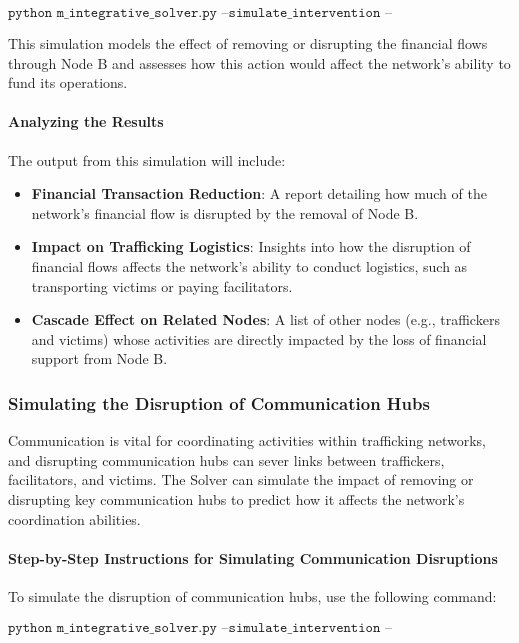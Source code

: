 \documentclass[%
 preprint, linenumbers,
 amsmath,amssymb,
 aps, physrev,
]{revtex4-2}
\begin{document}
\[
\texttt{python m\_integrative\_solver.py --simulate\_intervention --disrupt\_financial --node\_id 205}
\]

This simulation models the effect of removing or disrupting the financial flows through Node B and assesses how this action would affect the network’s ability to fund its operations.

\paragraph{Analyzing the Results}

The output from this simulation will include:
\begin{itemize}
    \item \textbf{Financial Transaction Reduction}: A report detailing how much of the network’s financial flow is disrupted by the removal of Node B.
    \item \textbf{Impact on Trafficking Logistics}: Insights into how the disruption of financial flows affects the network’s ability to conduct logistics, such as transporting victims or paying facilitators.
    \item \textbf{Cascade Effect on Related Nodes}: A list of other nodes (e.g., traffickers and victims) whose activities are directly impacted by the loss of financial support from Node B.
\end{itemize}

\subsubsection{Simulating the Disruption of Communication Hubs}

Communication is vital for coordinating activities within trafficking networks, and disrupting communication hubs can sever links between traffickers, facilitators, and victims. The Solver can simulate the impact of removing or disrupting key communication hubs to predict how it affects the network’s coordination abilities.

\paragraph{Step-by-Step Instructions for Simulating Communication Disruptions}

To simulate the disruption of communication hubs, use the following command:

\[
\texttt{python m\_integrative\_solver.py --simulate\_intervention --disrupt\_communication --node\_id [communication hub ID]}
\]
\end{document}
